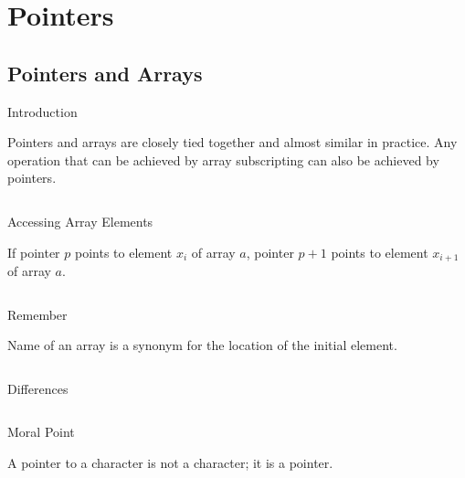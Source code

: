 \documentclass[compress]{beamer}
\begin{document}
\prepareCover

\section{Pointers}

\subsection{Pointers and Arrays}

\begin{slide}
	\begin{block}{Introduction}

	Pointers and arrays are closely tied together and almost similar in practice.
	Any operation that can be achieved by array subscripting can also be achieved by pointers.

	\inputminted[fontsize=\footnotesize, firstline=14, lastline=17, linenos]{c}{
		\resDirectory/array1.c
	}

	\end{block}
\end{slide}

\begin{slide}
	\begin{block}{Accessing Array Elements}

	If pointer $p$ points to element $x_i$ of array $a$, pointer $p+1$ points to element $x_{i + 1}$ of array $a$.

	\inputminted[fontsize=\footnotesize, firstline=14, lastline=19, linenos]{c}{
		\resDirectory/array1.c
	}

	\end{block}
\end{slide}

\begin{slide}
	\begin{block}{Remember}

	Name of an array is a synonym for the location of the initial element.

	\inputminted[fontsize=\footnotesize, firstline=14, lastline=19, linenos]{c}{
		\resDirectory/array2.c
	}

	\end{block}
\end{slide}

\begin{slide}
	\begin{block}{Differences}

	\inputminted[fontsize=\footnotesize, firstline=15, lastline=23, linenos]{c}{
		\resDirectory/string1.c
	}

	\end{block}
	\begin{block}{Moral Point}

	A pointer to a character is not a character; it is a pointer.

	\end{block}
\end{slide}
\end{document}
